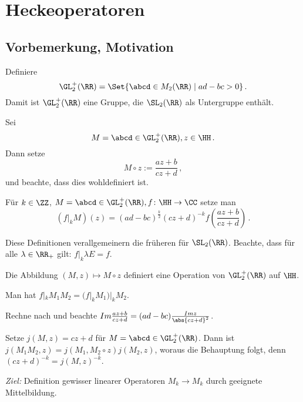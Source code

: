 \chapter{Heckeoperatoren}
\section{Vorbemerkung, Motivation}

\begin{defi}
Definiere 
\[
\GL_2^+(\RR) = \Set{ \abcd \in M_2(\RR) \mid ad-bc > 0 }
\,.
\]
Damit ist $\GL_2^+(\RR)$ eine Gruppe, die $\SL_2(\RR)$ als Untergruppe enthält.
\end{defi}

\begin{defi-list}
\item Sei 
\[
M = \abcd \in \GL_2^+(\RR), z \in \HH
\,.
\]
Dann setze
\[
M \circ z := \frac{az+b}{cz+d}
\,,
\]
und beachte, dass dies wohldefiniert ist.
\item Für $k \in \ZZ$, $M = \abcd \in \GL_2^+(\RR), f \colon \HH \to \CC$ setze man
\[
(f |_k M)(z) = (ad - bc)^{\frac{k}{2}} (cz + d)^{-k} f \left( \frac{az+b}{cz+d} \right)
\,.
\]
\end{defi-list}

Diese Definitionen verallgemeinern die früheren für $\SL_2(\RR)$. Beachte, dass für alle $\lambda \in \RR_+$ gilt: $f |_k \lambda E = f$.

\begin{lemm-list} \label{lemm}
\item Die Abbildung $(M, z) \mapsto M \circ z$ definiert eine Operation von $\GL_2^+(\RR)$ auf $\HH$.
\item Man hat $f |_k M_1 M_2 = (f |_k M_1) |_k M_2$.
\end{lemm-list}

\begin{bewe-list}
\item Rechne nach und beachte $Im \frac{az+b}{cz+d} = (ad-bc) \frac{Im z}{\abs{cz+d}^2}$.
\item Setze $j(M, z) = cz+d$ für $M = \abcd \in \GL_2^+(\RR)$. Dann ist $j(M_1 M_2, z) = j(M_1, M_2 \circ z) j(M_2, z)$, woraus die Behauptung folgt, denn $(cz+d)^{-k} = j(M, z)^{-k}$.
\end{bewe-list}

\emph{Ziel:} Definition gewisser linearer Operatoren $M_k \to M_k$ durch geeignete Mittelbildung.

